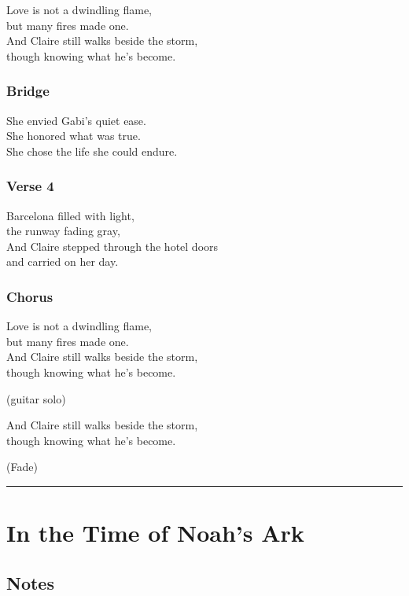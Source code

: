 Love is not a dwindling flame,\\
but many fires made one.\\
And Claire still walks beside the storm,\\
though knowing what he's become.

\subsubsection{Bridge}\label{bridge-1}

She envied Gabi's quiet ease.\\
She honored what was true.\\
She chose the life she could endure.

\subsubsection{Verse 4}\label{verse-4}

Barcelona filled with light,\\
the runway fading gray,\\
And Claire stepped through the hotel doors\\
and carried on her day.

\subsubsection{Chorus}\label{chorus-5}

Love is not a dwindling flame,\\
but many fires made one.\\
And Claire still walks beside the storm,\\
though knowing what he's become.

(guitar solo)

And Claire still walks beside the storm,\\
though knowing what he's become.

(Fade)

\begin{center}\rule{0.5\linewidth}{0.5pt}\end{center}

\section{In the Time of Noah's Ark}\label{in-the-time-of-noahs-ark}

\subsection{Notes}\label{notes-4}

